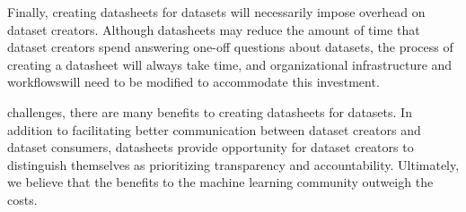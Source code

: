 Finally, creating datasheets for datasets will necessarily impose
overhead on dataset creators. Although datasheets may reduce the
amount of time that dataset creators spend answering one-off questions
about datasets, the process of creating a datasheet will always take
time, and organizational infrastructure and workflowswill need to be modified to accommodate this investment.

 challenges, there are many benefits to
creating datasheets for datasets. In addition to facilitating better
communication between dataset creators and dataset consumers,
datasheets provide  opportunity for dataset creators to distinguish
themselves as prioritizing transparency and
accountability. Ultimately, we believe that the benefits to the
machine learning community outweigh the costs.
